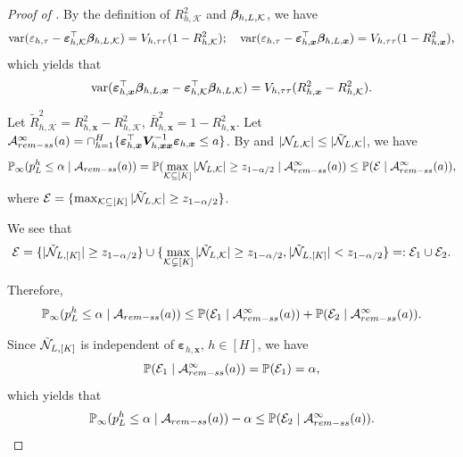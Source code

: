 \documentclass[10pt,a4paper]{amsart}
\newcommand{\Lin}{\textnormal{L}}
\newcommand{\Prob}{\mathbb{P}}
\newcommand{\bs}{\boldsymbol}
\newcommand{\hpL}{p_\textnormal{L}^{\textnormal{h}}}
\newcommand{\mk}{\mathcal{K}}
\newcommand{\remss}{\textnormal{rem-ss}}
\newcommand{\var}{\operatorname{var}}
\begin{document}
\begin{proof}[Proof of ]
By the definition of $R^2_{h,\mk}$ and $\bs{\beta}_{ h, \Lin, \mk}$, we have
\begin{align*}
    \var(\varepsilon_{h,\tau}-\bs{\varepsilon}_{ h, \mk}^\top\bs{\beta}_{ h, \Lin, \mk}) = V_{ h,\tau\tau}(1-R^2_{ h, \mk});\quad \var(\varepsilon_{h,\tau} -  \bs{\varepsilon}_{ h, \bs{x}}^\top \bs{\beta}_{h, \Lin , \bs{x}}) = V_{ h,\tau\tau}(1 - R^2_{ h, \bs{x}}),
\end{align*}
which yields that
\begin{align*}
 \var(\bs{\varepsilon}_{ h, \bs{x}}^\top \bs{\beta}_{h, \Lin , \bs{x}}-\bs{\varepsilon}_{ h, \mk}^\top\bs{\beta}_{ h, \Lin, \mk}) =  V_{ h,\tau\tau} (R^2_{ h, \bs{x}} - R^2_{ h, \mk}).
\end{align*}

Let $\tilde{R}^2_{ h, \mk} = R^2_{ h, \bs{x}} - R^2_{ h, \mk}$, $\bar{R}_{h,\bs{x}}^2 = 1 - R_{h,\bs{x}}^2$. Let $\mathcal{A}_{\remss}^{\infty}(a) = \cap_{h=1}^H\{\bs{\varepsilon}_{h,\bs{x}}^\top\bs{V}_{h,\bs{x}\bs{x}}^{-1}\bs{\varepsilon}_{h,\bs{x}}\leq a\}$. By  and $|\mathcal{N}_{\Lin,\mk}|\leq |\tilde{\mathcal{N}}_{\Lin,\mk}|$, we have
\[
\Prob_{\infty}(\hpL \leq \alpha \mid \mathcal{A}_{\remss}(a)) = \Prob(\max_{\mk \subseteq [K]}|\mathcal{N}_{\Lin,\mk}|\geq z_{1-\alpha/2}\mid\mathcal{A}^\infty_{\remss}(a)) \leq  \Prob(\mathcal{E}\mid\mathcal{A}^\infty_{\remss}(a)),
\] 
where $\mathcal{E} = \{ \max_{\mk \subseteq [K]} |\tilde{\mathcal{N}}_{\Lin,\mk}| \geq z_{1-\alpha/2}\}$. 

We see that
\[
\mathcal{E} = \{ |\tilde{\mathcal{N}}_{\Lin,[K]}| \geq z_{1-\alpha/2}\} \cup \{ \max_{\mk \subsetneq [K]} |\tilde{\mathcal{N}}_{\Lin,\mk}| \geq z_{1-\alpha/2}, |\tilde{\mathcal{N}}_{\Lin,[K]}| < z_{1-\alpha/2}\} =: \mathcal{E}_1\cup\mathcal{E}_2.
\]

Therefore, 
\begin{align*}
\Prob_{\infty}(\hpL \leq \alpha \mid \mathcal{A}_{\remss}(a)) \leq \Prob(\mathcal{E}_1\mid\mathcal{A}_{\remss}^{\infty}(a))+\Prob(\mathcal{E}_2\mid\mathcal{A}_{\remss}^{\infty}(a)).
\end{align*}

Since $\tilde{\mathcal{N}}_{\Lin,[K]}$ is independent of $\bs{\varepsilon}_{h,\bs{x}}$, $h\in [H]$, we have
\[
\Prob(\mathcal{E}_1\mid\mathcal{A}_{\remss}^{\infty}(a)) = \Prob(\mathcal{E}_1) = \alpha,
\]
which yields that
\[
\Prob_{\infty}(\hpL \leq \alpha \mid \mathcal{A}_{\remss}(a))-\alpha \leq \Prob(\mathcal{E}_2\mid\mathcal{A}_{\remss}^{\infty}(a)).
\]


\end{proof}
\end{document}
